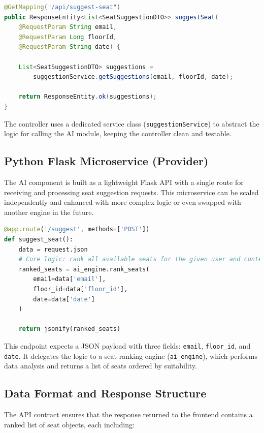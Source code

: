 \documentclass[12pt,a4paper]{report} %
\begin{document}
\begin{lstlisting}[language=Java, caption=Spring Boot Controller]
@GetMapping("/api/suggest-seat")
public ResponseEntity<List<SeatSuggestionDTO>> suggestSeat(
    @RequestParam String email,
    @RequestParam Long floorId,
    @RequestParam String date) {
    
    List<SeatSuggestionDTO> suggestions = 
        suggestionService.getSuggestions(email, floorId, date);
        
    return ResponseEntity.ok(suggestions);
}
\end{lstlisting}

The controller uses a dedicated service class (\texttt{suggestionService}) to abstract the logic for calling the AI module, keeping the controller clean and testable.

\subsection*{Python Flask Microservice (Provider)}

The AI component is built as a lightweight Flask API with a single route for receiving and processing seat suggestion requests. This microservice can be scaled independently and enhanced with more complex logic or even swapped with another engine in the future.

\begin{lstlisting}[language=Python, caption=Python Flask Endpoint]
@app.route('/suggest', methods=['POST'])
def suggest_seat():
    data = request.json
    # Core logic: rank all available seats for the given user and context
    ranked_seats = ai_engine.rank_seats(
        email=data['email'],
        floor_id=data['floor_id'],
        date=data['date']
    )

    return jsonify(ranked_seats)
\end{lstlisting}

This endpoint expects a JSON payload with three fields: \texttt{email}, \texttt{floor\_id}, and \texttt{date}. It delegates the logic to a seat ranking engine (\texttt{ai\_engine}), which performs data analysis and returns a list of seats ordered by suitability.

\subsection*{Data Format and Response Structure}

The API contract ensures that the response returned to the frontend contains a ranked list of seat objects, each including:
\end{document}
